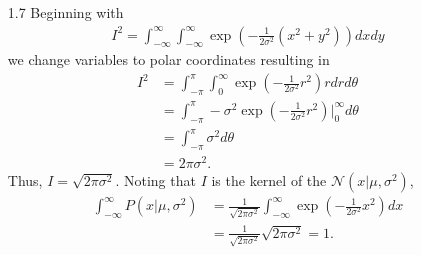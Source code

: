 \documentclass[]{article}
\begin{document}
\begin{enumerate}
	\item[1.7] Beginning with
	\begin{align*}
	I^2 = \int_{-\infty}^{\infty} \int_{-\infty}^{\infty} \exp\left( -\frac{1}{2\sigma^2}(x^2 + y^2) \right) dx dy 
	\end{align*}
	we change variables to polar coordinates resulting in
	\begin{align*}
	I^2 &= \int_{-\pi}^{\pi} \int_{0}^{\infty} \exp \left( - \frac{1}{2 \sigma^2} r^2 \right) r dr d\theta \\
	&= \int_{-\pi}^{\pi}  -\sigma^2 \exp \left( - \frac{1}{2 \sigma^2} r^2 \right)\Big|^\infty_0 d\theta \\
	&= \int_{-\pi}^{\pi} \sigma^2 d \theta \\
	&= 2 \pi \sigma^2.
	\end{align*}
	Thus, $I = \sqrt{2 \pi \sigma^2} $. Noting that $I$ is the kernel of the $\mathcal{N}(x | \mu, \sigma^2)$,
	\begin{align*}
	\int_{-\infty}^\infty P(x|\mu,\sigma^2) &=  \frac{1}{\sqrt{2 \pi \sigma^2}} \int_{-\infty}^{\infty}  \exp \left( -\frac{1}{2 \sigma^2}x^2 \right) dx \\
	 &= \frac{1}{\sqrt{2 \pi \sigma^2}} \sqrt{2 \pi \sigma^2} = 1.
	\end{align*}
	

\end{enumerate}
\end{document}
